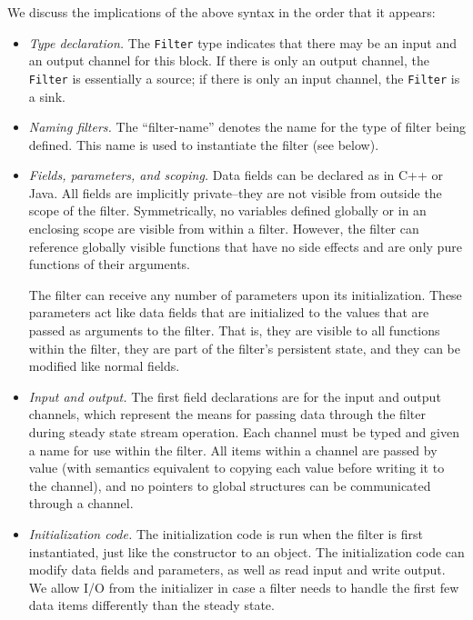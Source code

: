 We discuss the implications of the above syntax in the order that it
appears:

\begin{itemize}

\item {\it Type declaration.}  The {\tt Filter} type indicates that
there may be an input and an output channel for this block.  If there is
only an output channel, the {\tt Filter} is essentially a source; if there is
only an input channel, the {\tt Filter} is a sink.

\item {\it Naming filters.}  The ``filter-name'' denotes the name for
the type of filter being defined.  This name is used to instantiate
the filter (see below).

\item {\it Fields, parameters, and scoping.}  Data fields can be
declared as in C++ or Java.  All fields are implicitly private--they
are not visible from outside the scope of the filter.  Symmetrically,
no variables defined globally or in an enclosing scope are visible
from within a filter.  However, the filter can reference globally
visible functions that have no side effects and are only pure
functions of their arguments.

The filter can receive any number of parameters upon its
initialization.  These parameters act like data fields that are
initialized to the values that are passed as arguments to the filter.
That is, they are visible to all functions within the filter, they are
part of the filter's persistent state, and they can be modified like
normal fields.

\item {\it Input and output.}  The first field declarations are for
the input and output channels, which represent the means for passing
data through the filter during steady state stream operation.  Each
channel must be typed and given a name for use within the filter.  All
items within a channel are passed by value (with semantics equivalent
to copying each value before writing it to the channel), and no
pointers to global structures can be communicated through a channel.

\item {\it Initialization code.}  The initialization code is run when
the filter is first instantiated, just like the constructor to an
object.  The initialization code can modify data fields and
parameters, as well as read input and write output.  We allow I/O from
the initializer in case a filter needs to handle the first few data
items differently than the steady state.


\end{itemize}
